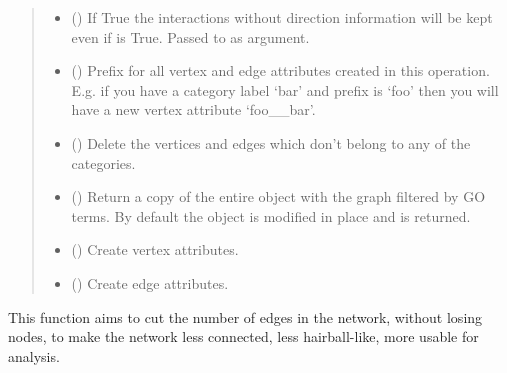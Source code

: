 \documentclass[letterpaper,10pt,english]{sphinxmanual}
\begin{document}
\begin{fulllineitems}
\begin{fulllineitems}
\begin{quote}
\begin{description}
\begin{itemize}
\item {} 
 () \textendash{} If True the interactions without direction information will be
kept even if  is True. Passed to 
as  argument.

\item {} 
 () \textendash{} Prefix for all vertex and edge attributes created in this
operation. E.g. if you have a category label ‘bar’ and prefix
is ‘foo’ then you will have a new vertex attribute ‘foo\_\_bar’.

\item {} 
 () \textendash{} Delete the vertices and edges which don’t belong to any of the
categories.

\item {} 
 () \textendash{} Return a copy of the entire  object with the graph
filtered by GO terms. By default the object is modified in place
and  is returned.

\item {} 
 () \textendash{} Create vertex attributes.

\item {} 
 () \textendash{} Create edge attributes.

\end{itemize}

\end{description}\end{quote}

\end{fulllineitems}


\begin{fulllineitems}
\label{\detokenize{reference:pypath.main.PyPath.network_filter}}
This function aims to cut the number of edges in the network,
without losing nodes, to make the network less connected,
less hairball-like, more usable for analysis.


\end{fulllineitems}
\end{fulllineitems}
\end{document}
